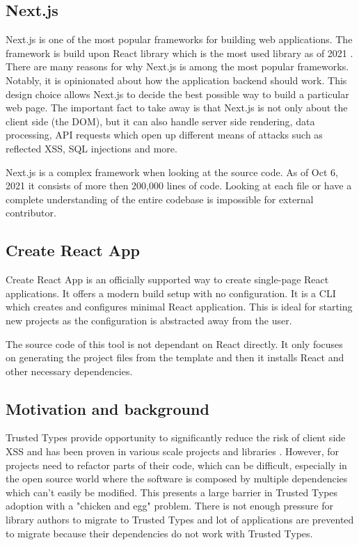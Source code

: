 \subsection{Next.js}
\label{intro-nextjs}

Next.js is one of the most popular frameworks for building web applications. The framework is build
upon React library which is the most used library as of 2021 \cite{react_most_used_2021}. There are
many reasons for why Next.js is among the most popular frameworks. Notably, it is opinionated about
how the application backend should work. This design choice allows Next.js to decide the best
possible way to build a particular web page. The important fact to take away is that Next.js is not
only about the client side (the DOM), but it can also handle server side rendering, data processing,
API requests which open up different means of attacks such as reflected XSS, SQL injections and
more.

Next.js is a complex framework when looking at the source code. As of Oct 6, 2021 it consists of
more then 200,000 lines of code. Looking at each file or have a complete understanding of the
entire codebase is impossible for external contributor.

\subsection{Create React App}
\label{intro-cra}

Create React App is an officially supported way to create single-page React applications. It offers
a modern build setup with no configuration. It is a CLI which creates and configures minimal React
application. This is ideal for starting new projects as the configuration is abstracted away from
the user.

The source code of this tool is not dependant on React directly. It only focuses on generating the
project files from the template and then it installs React and other necessary dependencies.

\subsection{Motivation and background}

Trusted Types provide opportunity to significantly reduce the risk of client side XSS and has been
proven in various scale projects and libraries \cite{tt_web_framework_paper}
\cite{tt_integration_list}. However, for projects need to refactor parts of their code, which can be
difficult, especially in the open source world where the software is composed by multiple
dependencies which can't easily be modified. This presents a large barrier in Trusted Types adoption
\cite{tt_web_framework_paper} with a "chicken and egg" problem. There is not enough pressure for
library authors to migrate to Trusted Types and lot of applications are prevented to migrate because
their dependencies do not work with Trusted Types.

